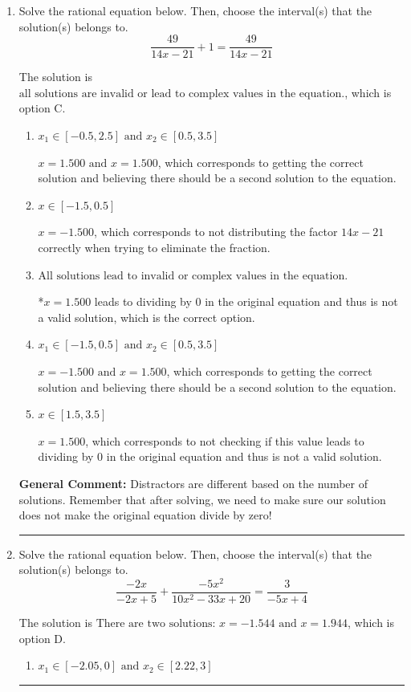 \documentclass{extbook}[14pt]
\newcommand{\litem}[1]{\item #1

\rule{\textwidth}{0.4pt}}
\begin{document}
\begin{enumerate}\litem{
Solve the rational equation below. Then, choose the interval(s) that the solution(s) belongs to.
\[ \frac{49}{14x -21} + 1 = \frac{49}{14x -21} \]

The solution is \( \text{all solutions are invalid or lead to complex values in the equation.} \), which is option C.\begin{enumerate}[label=\Alph*.]
\item \( x_1 \in [-0.5, 2.5] \text{ and } x_2 \in [0.5,3.5] \)

$x = 1.500 \text{ and } x = 1.500$, which corresponds to getting the correct solution and believing there should be a second solution to the equation.
\item \( x \in [-1.5,0.5] \)

$x = -1.500$, which corresponds to not distributing the factor $14x -21$ correctly when trying to eliminate the fraction.
\item \( \text{All solutions lead to invalid or complex values in the equation.} \)

*$x = 1.500$ leads to dividing by 0 in the original equation and thus is not a valid solution, which is the correct option.
\item \( x_1 \in [-1.5, 0.5] \text{ and } x_2 \in [0.5,3.5] \)

$x = -1.500 \text{ and } x = 1.500$, which corresponds to getting the correct solution and believing there should be a second solution to the equation.
\item \( x \in [1.5,3.5] \)

$x = 1.500$, which corresponds to not checking if this value leads to dividing by 0 in the original equation and thus is not a valid solution.
\end{enumerate}

\textbf{General Comment:} Distractors are different based on the number of solutions. Remember that after solving, we need to make sure our solution does not make the original equation divide by zero!
}
\litem{
Solve the rational equation below. Then, choose the interval(s) that the solution(s) belongs to.
\[ \frac{-2x}{-2x + 5} + \frac{-5x^{2}}{10x^{2} -33 x + 20} = \frac{3}{-5x + 4} \]

The solution is \( \text{There are two solutions: } x = -1.544 \text{ and } x = 1.944 \), which is option D.\begin{enumerate}[label=\Alph*.]
\item \( x_1 \in [-2.05, 0] \text{ and } x_2 \in [2.22,3] \)



\end{enumerate}}
\end{enumerate}
\end{document}
